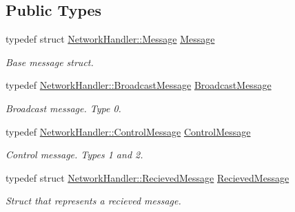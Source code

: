 \subsection*{Public Types}
\begin{DoxyCompactItemize}
\item 
\mbox{\label{classNetworkHandler_a40a384ea43787b06682a000b015add29}} 
typedef struct \mbox{\hyperlink{structNetworkHandler_1_1Message}{Network\+Handler\+::\+Message}} \mbox{\hyperlink{classNetworkHandler_a40a384ea43787b06682a000b015add29}{Message}}
\begin{DoxyCompactList}\small\item\em Base message struct. \end{DoxyCompactList}\item 
\mbox{\label{classNetworkHandler_a5efffc9f48abe8087c6f756e33d5eb9e}} 
typedef \mbox{\hyperlink{structNetworkHandler_1_1BroadcastMessage}{Network\+Handler\+::\+Broadcast\+Message}} \mbox{\hyperlink{classNetworkHandler_a5efffc9f48abe8087c6f756e33d5eb9e}{Broadcast\+Message}}
\begin{DoxyCompactList}\small\item\em Broadcast message. Type 0. \end{DoxyCompactList}\item 
typedef \mbox{\hyperlink{structNetworkHandler_1_1ControlMessage}{Network\+Handler\+::\+Control\+Message}} \mbox{\hyperlink{classNetworkHandler_a29cb429e8069fa3c00b8317aec0b735a}{Control\+Message}}
\begin{DoxyCompactList}\small\item\em Control message. Types 1 and 2. \end{DoxyCompactList}\item 
\mbox{\label{classNetworkHandler_a558eabe1d275787ab92e63c7bbabf19c}} 
typedef struct \mbox{\hyperlink{structNetworkHandler_1_1RecievedMessage}{Network\+Handler\+::\+Recieved\+Message}} \mbox{\hyperlink{classNetworkHandler_a558eabe1d275787ab92e63c7bbabf19c}{Recieved\+Message}}
\begin{DoxyCompactList}\small\item\em Struct that represents a recieved message. \end{DoxyCompactList}\end{DoxyCompactItemize}
